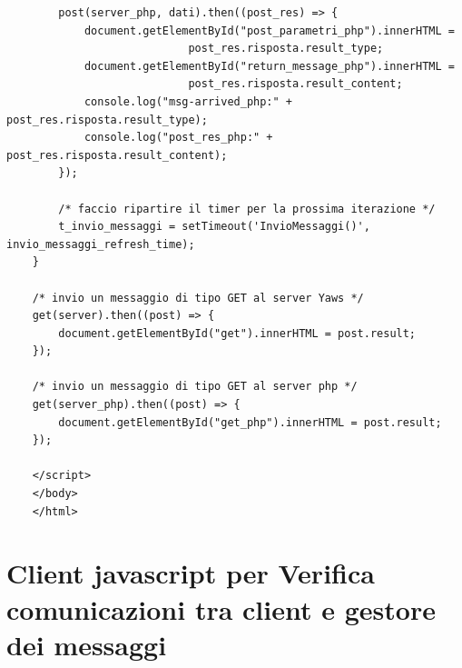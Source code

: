 \begin{verbatim}
		post(server_php, dati).then((post_res) => {
			document.getElementById("post_parametri_php").innerHTML = 
							post_res.risposta.result_type;
			document.getElementById("return_message_php").innerHTML = 
							post_res.risposta.result_content;
			console.log("msg-arrived_php:" + post_res.risposta.result_type);
			console.log("post_res_php:" + post_res.risposta.result_content);
		});
		
		/* faccio ripartire il timer per la prossima iterazione */
		t_invio_messaggi = setTimeout('InvioMessaggi()', invio_messaggi_refresh_time); 
	}

	/* invio un messaggio di tipo GET al server Yaws */	
	get(server).then((post) => {
		document.getElementById("get").innerHTML = post.result;
	});
	
	/* invio un messaggio di tipo GET al server php */	
	get(server_php).then((post) => {
		document.getElementById("get_php").innerHTML = post.result;
	});

	</script>
	</body>
	</html>

\end{verbatim}

\section{Client javascript per Verifica comunicazioni tra client e gestore dei messaggi}
\label{javascript_verifica_comunicazione_src}

